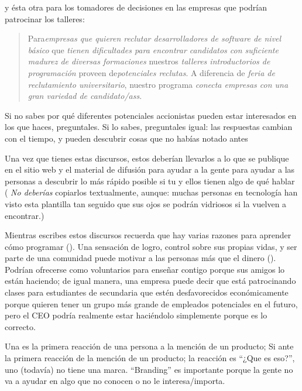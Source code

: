 \noindent
y ésta otra para los tomadores de decisiones en las empresas que podrían patrocinar los talleres:

\begin{quote}

 Para\emph{empresas que quieren reclutar desarrolladores de software de nivel básico}
  que \emph{ tienen dificultades para  encontrar candidatos con suficiente madurez  de diversas formaciones}
  nuestros \emph{ talleres introductorios de programación}
  proveen de\emph{potenciales reclutas}.
  A diferencia de \emph{ feria de reclutamiento universitario},
  nuestro programa \emph{ conecta empresas con una gran variedad de candidato/ass}.


\end{quote}

Si no sabes por qué diferentes potenciales accionistas pueden estar interesados en los que haces,
preguntales.
Si lo sabes,
preguntales igual:
las respuestas cambian con el tiempo,
y pueden descubrir cosas que no habías notado antes

Una vez que tienes estas discursos,
estos deberían llevarlos a lo que se publique en el sitio web y el material de difusión
para ayudar a la gente para ayudar a las personas a descubrir lo más rápido posible
si tu y ellos tienen algo de qué hablar
( \emph{No deberías} copiarlos textualmente,
aunque:
muchas personas en tecnología han visto esta plantilla tan seguido que 
sus ojos se podrán vidriosos si la vuelven a encontrar.)



Mientras escribes estos discursos
recuerda que hay varias razones para aprender cómo programar
().
Una sensación de logro,
control sobre sus propias vidas,
y ser parte de una comunidad puede motivar a las personas más que el dinero
().
Podrían ofrecerse como voluntarios para enseñar contigo  porque sus amigos lo están haciendo;
 de igual manera,
 una empresa puede decir que está patrocinando clases para estudiantes de secundaria que estén desfavorecidos económicamente
 porque quieren tener un grupo más grande de empleados potenciales en el futuro, 
 pero el CEO podría realmente estar haciéndolo simplemente porque es lo correcto.


Una  es la primera reacción de una persona a la mención de un producto;
Si ante la primera reacción de la mención de un producto;
la reacción es ``¿Que es eso?'',
uno (todavía) no tiene una marca.
``Branding'' es importante porque
la gente no va a ayudar en algo que no conocen o no le interesa/importa.

